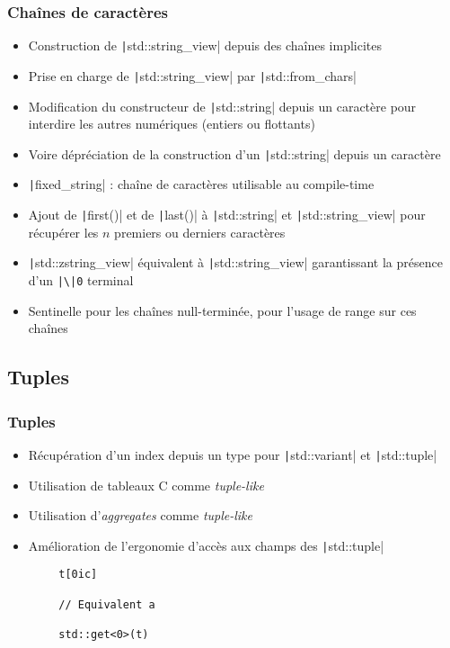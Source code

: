 \documentclass[C++.tex]{subfiles}
\begin{document}
\begin{frame}[fragile]
	\frametitle{Chaînes de caractères}
	\begin{itemize}
		\item Construction de \texttt|std::string_view| depuis des chaînes implicites
		\item Prise en charge de \texttt|std::string_view| par \texttt|std::from_chars|
		\item Modification du constructeur de \texttt|std::string| depuis un caractère pour interdire les autres numériques (entiers ou flottants)
		\item Voire dépréciation de la construction d'un \texttt|std::string| depuis un caractère
		\item \texttt|fixed_string| : chaîne de caractères utilisable au compile-time
		\item Ajout de \texttt|first()| et de \texttt|last()| à \texttt|std::string| et \texttt|std::string_view| pour récupérer les $n$ premiers ou derniers caractères
		\item \texttt|std::zstring_view| équivalent à \texttt|std::string_view| garantissant la présence d'un \texttt{|\textbackslash|0} terminal
		\item Sentinelle pour les chaînes null-terminée, pour l'usage de range sur ces chaînes
	\end{itemize}

\end{frame}

\subsection*{Tuples}
\begin{frame}[fragile]
	\frametitle{Tuples}
	\begin{itemize}
		\item Récupération d'un index depuis un type pour \texttt|std::variant| et \texttt|std::tuple|
		\item Utilisation de tableaux C comme \textit{tuple-like}
		\item Utilisation d'\textit{aggregates} comme \textit{tuple-like}
		\item Amélioration de l'ergonomie d'accès aux champs des \texttt|std::tuple|
	\end{itemize}

	\begin{verbatim}
		t[0ic]

		// Equivalent a

		std::get<0>(t)
	\end{verbatim}

\end{frame}
\end{document}
